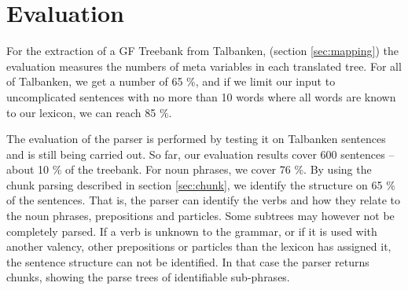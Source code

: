 \documentclass[runningheads,a4paper]{llncs}
\begin{document}
\section{Evaluation}

For the extraction of a GF Treebank from Talbanken, (section \ref{sec:mapping})
the evaluation measures the numbers of meta variables in each translated tree.
For all of Talbanken, we get a number of 65 \%, and if we limit our input to
uncomplicated sentences with no more than 10 words where all words are known to
our lexicon, we can reach 85 \%. 


The evaluation of the parser is performed by testing it on Talbanken sentences
and is still being carried out. So far, our evaluation results cover
600 sentences -- about 10 \% of the treebank. 
For noun phrases, we cover 76 \%.  By using the chunk parsing described in section
\ref{sec:chunk}, we identify the structure on 65 \% of the sentences. That
is, the parser can identify the verbs and how they relate to the noun phrases,
prepositions and particles. Some subtrees may  however not be
completely parsed. If a verb is unknown to the grammar, or if it is used with
another valency, other prepositions or particles than the lexicon has assigned
it, the sentence structure can not be identified. In that case
the parser returns chunks, showing the parse trees of identifiable sub-phrases.
\end{document}
